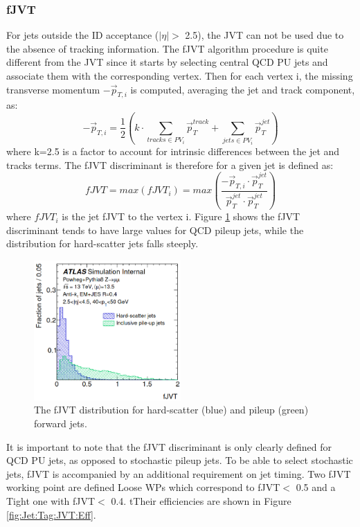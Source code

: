 \subsubsection{fJVT}
\label{Jet:Tag:JVT:fJVT}
For jets outside the ID acceptance ($|\eta|>$ 2.5), the JVT can not be used due to the absence of tracking information. The fJVT algorithm procedure is quite different from the JVT since it starts by selecting central QCD PU jets and associate them with the corresponding vertex. Then for each vertex i, the missing transverse momentum $-\vec{p}_{T, i}$ is computed, averaging the jet and track component, as:
\begin{equation}
    -\vec{p}_{T, i}=\frac{1}{2}\left(k \cdot \sum_{tracks \in P V_{i}} \vec{p}_{T}^{track }+\sum_{jets \in PV_{i}} \vec{p}_{T}^{jet}\right)
\end{equation}
where k=2.5 is a factor to account for intrinsic differences between the jet and tracks terms. The fJVT discriminant is therefore for a given jet is defined as:
\begin{equation}
    fJVT = max(fJVT_i) = max(\frac{-\vec{p}_{T, i} \cdot \vec{p}_{T}^{j e t}}{\vec{p}_{T}^{j e t} \cdot \vec{p}_{T}^{j e t}})
\end{equation}
where $fJVT_i$ is the jet fJVT to the vertex i. Figure \ref{fig:Jet:Tag:JVT:fJVT} shows the fJVT discriminant tends to have large values for QCD pileup jets, while the distribution for hard-scatter jets falls steeply.
\begin{figure}[htbp]
    \centering
    \includegraphics[width=0.5\textwidth]{Ch4/Img/fJVT.png}
    \caption{The fJVT distribution for hard-scatter (blue) and pileup (green) forward jets.}
    \label{fig:Jet:Tag:JVT:fJVT}
\end{figure}
It is important to note that the fJVT discriminant is only clearly defined for QCD PU jets, as opposed to stochastic pileup jets. To be able to select stochastic jets, fJVT is accompanied by an additional requirement on jet timing. Two fJVT working point are defined Loose WPs which correspond to fJVT$<$ 0.5 and a Tight one with fJVT$<$ 0.4. tTheir efficiencies are shown in Figure \ref{fig:Jet:Tag:JVT:Eff}.
